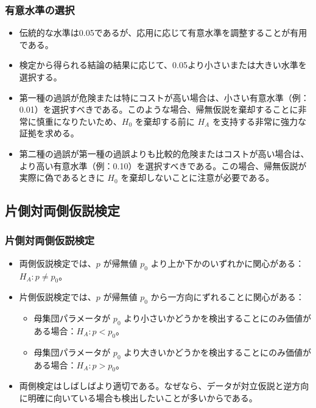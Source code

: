 
\begin{frame}
\frametitle{有意水準の選択}

\begin{itemize}

\item 伝統的な水準は0.05であるが、応用に応じて有意水準を調整することが有用である。

\item 検定から得られる結論の結果に応じて、0.05より小さいまたは大きい水準を選択する。

\item 第一種の過誤が危険または特にコストが高い場合は、小さい有意水準（例：0.01）を選択すべきである。このような場合、帰無仮説を棄却することに非常に慎重になりたいため、$H_0$ を棄却する前に $H_A$ を支持する非常に強力な証拠を求める。

\item 第二種の過誤が第一種の過誤よりも比較的危険またはコストが高い場合は、より高い有意水準（例：0.10）を選択すべきである。この場合、帰無仮説が実際に偽であるときに $H_0$ を棄却しないことに注意が必要である。

\end{itemize}

\end{frame}


\subsection{片側対両側仮説検定}


\begin{frame}
\frametitle{片側対両側仮説検定}

\begin{itemize}

\item 両側仮説検定では、$p$ が帰無値 $p_0$ より上か下かのいずれかに関心がある：$H_A: p \ne p_0$。

\item 片側仮説検定では、$p$ が帰無値 $p_0$ から一方向にずれることに関心がある：
\begin{itemize}
\item 母集団パラメータが $p_0$ より小さいかどうかを検出することにのみ価値がある場合：$H_A: p < p_0$。
\item 母集団パラメータが $p_0$ より大きいかどうかを検出することにのみ価値がある場合：$H_A: p > p_0$。
\end{itemize}

\item 両側検定はしばしばより適切である。なぜなら、データが対立仮説と逆方向に明確に向いている場合も検出したいことが多いからである。

\end{itemize}

\end{frame}

